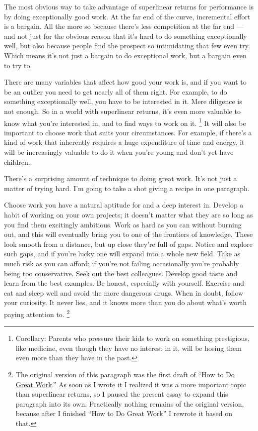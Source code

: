 The most obvious way to take advantage of superlinear returns for
performance is by doing exceptionally good work. At the far end of the
curve, incremental effort is a bargain. All the more so because there's
less competition at the far end --- and not just for the obvious reason
that it's hard to do something exceptionally well, but also because
people find the prospect so intimidating that few even try. Which means
it's not just a bargain to do exceptional work, but a bargain even to
try to.

There are many variables that affect how good your work is, and if you
want to be an outlier you need to get nearly all of them right. For
example, to do something exceptionally well, you have to be interested
in it. Mere diligence is not enough. So in a world with superlinear
returns, it's even more valuable to know what you're interested in, and
to find ways to work on it. \footnote{Corollary: Parents who pressure their kids to work on something
prestigious, like medicine, even though they have no interest in it,
will be hosing them even more than they have in the past.} It will also be
important to choose work that suits your circumstances. For example, if
there's a kind of work that inherently requires a huge expenditure of
time and energy, it will be increasingly valuable to do it when you're
young and don't yet have children.

There's a surprising amount of technique to doing great work. It's not
just a matter of trying hard. I'm going to take a shot giving a recipe
in one paragraph.

Choose work you have a natural aptitude for and a deep interest in.
Develop a habit of working on your own projects; it doesn't matter what
they are so long as you find them excitingly ambitious. Work as hard as
you can without burning out, and this will eventually bring you to one
of the frontiers of knowledge. These look smooth from a distance, but up
close they're full of gaps. Notice and explore such gaps, and if you're
lucky one will expand into a whole new field. Take as much risk as you
can afford; if you're not failing occasionally you're probably being too
conservative. Seek out the best colleagues. Develop good taste and learn
from the best examples. Be honest, especially with yourself. Exercise
and eat and sleep well and avoid the more dangerous drugs. When in
doubt, follow your curiosity. It never lies, and it knows more than you
do about what's worth paying attention to. \footnote{The original version of this paragraph was the first draft of
``\href{greatwork.html}{How to Do Great Work}.'' As soon as I wrote it I
realized it was a more important topic than superlinear returns, so I
paused the present essay to expand this paragraph into its own.
Practically nothing remains of the original version, because after I
finished ``How to Do Great Work'' I rewrote it based on that.}


